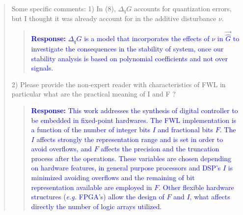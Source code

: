 \documentclass[11pt]{article}
\begin{document}
\begin{quote}
Some specific comments:
1) In (8), $\Delta_{q} G$ accounts for quantization errors, but I thought it was already account for in the additive disturbance $\nu$.

\begin{quote}
\textcolor{blue}{\textbf{Response:} $\Delta_{q} G$ is a model that incorporates the effects of $\nu$ in $\vec{\hat{G}}$ to investigate the consequences in the stability of system, once our stability analysis is based on polynomial coefficients and not over signals.}
\end{quote}


2) Please provide the non-expert reader with characteristics of FWL in particular what are the practical meaning of I and F ?

\begin{quote}
\textcolor{blue}{\textbf{Response:} This work addresses the synthesis of digital controller to be embedded in fixed-point hardwares. The FWL implementation is a function of the number of integer bits $I$ and fractional bits $F$. The $I$ affects strongly the representation range and is set in order to avoid overflows, and $F$ affects the precision and the truncation process after the operations. These variables are chosen depending on hardware features, in general purpose processors and DSP's $I$ is minimized avoiding overflows and the remaining of bit representation available are employed in $F$. Other flexible hardware structures (\textit{e.g.} FPGA's) allow the design of $F$ and $I$, what affects directly the number of logic arrays utilized.}
\end{quote}


\end{quote}
\end{document}
